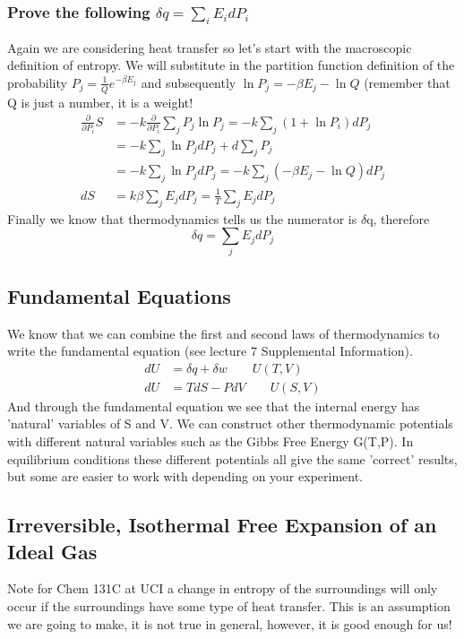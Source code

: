 \documentclass{article}
\begin{document}
\subsubsection*{Prove the following $\delta q = \displaystyle\sum_iE_idP_i$}
Again we are considering heat transfer so let's start with the macroscopic definition of entropy.
We will substitute in the partition function definition of the probability $P_j = \frac{1}{Q}e^{-\beta E_j}$ and subsequently $\ln P_j = -\beta E_j -\ln Q$ (remember that Q is just a number, it is a weight!
\begin{equation}
\begin{split}
\frac{\partial}{\partial P_i}S &= -k\frac{\partial}{\partial P_i}\sum_j P_j \ln P_j = -k\sum_j ( 1+\ln P_i)dP_j \\
 &= -k\sum_j \ln P_j dP_j + d \sum_j P_j \\
 &= -k\sum_j\ln P_j dP_j = -k\sum_j (-\beta E_j - \ln Q) dP_j \\
 dS &= k\beta \sum_j E_jdP_j = \frac{1}{T}\sum_jE_jdP_j
\end{split}
\end{equation}
Finally we know that thermodynamics tells us the numerator is $\delta$q, therefore 
\begin{equation}
\delta q = \sum_j E_j dP_j
\end{equation}

\subsection*{Fundamental Equations}
We know that we can combine the first and second laws of thermodynamics to write the fundamental equation (see lecture 7 Supplemental Information). 
\begin{equation}
\begin{split}
    dU &= \delta q + \delta w \qquad U(T,V) \\
    dU &= TdS - PdV \qquad U(S,V)
\end{split}
\end{equation}
And through the fundamental equation we see that the internal energy has 'natural' variables of S and V. 
We can construct other thermodynamic potentials with different natural variables such as the Gibbs Free Energy G(T,P). 
In equilibrium conditions these different potentials all give the same 'correct' results, but some are easier to work with depending on your experiment. 

\subsection*{Irreversible, Isothermal Free Expansion of an Ideal Gas}
Note for Chem 131C at UCI a change in entropy of the surroundings will only occur if the surroundings have some type of heat transfer. 
This is an assumption we are going to make, it is not true in general, however, it is good enough for us!
\end{document}

